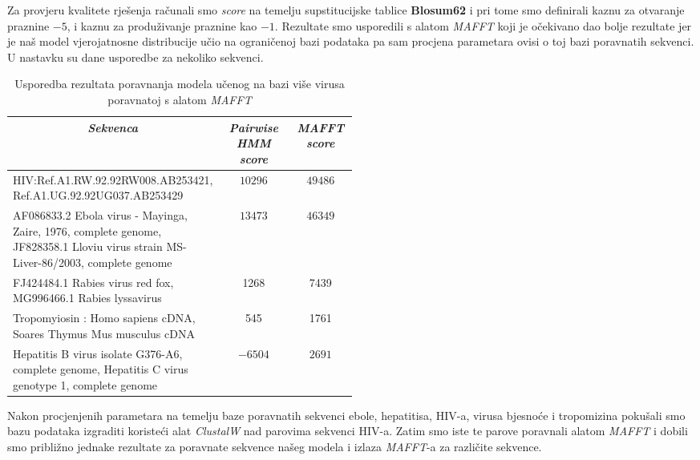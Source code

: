 \documentclass[a4paper]{article}
\begin{document}
Za provjeru kvalitete rješenja računali smo \textit{score} na temelju supstitucijske tablice \textbf{Blosum62} i pri tome smo definirali kaznu za otvaranje praznine $-5$, i kaznu za produživanje praznine kao $-1$. Rezultate smo usporedili s alatom \textit{MAFFT} koji je očekivano dao bolje rezultate jer je naš model vjerojatnosne distribucije učio na ograničenoj bazi podataka pa sam procjena parametara ovisi o toj bazi poravnatih sekvenci. U nastavku su dane usporedbe za nekoliko sekvenci.
\begin{table}[H]
\centering
\begin{tabular}{|p{0.5\linewidth}|c| c|}
\hline
\multicolumn{1}{|c|}{\textit{\textbf{Sekvenca}}} & \multicolumn{1}{c|}{\textit{\textbf{Pairwise HMM score }}} & \multicolumn{1}{c|}{\textit{\textbf{MAFFT score}}}                                      \tabularnewline \hline
HIV:Ref.A1.RW.92.92RW008.AB253421, Ref.A1.UG.92.92UG037.AB253429 & $10296$ & $49486$  \\ \hline
AF086833.2 Ebola virus - Mayinga, Zaire, 1976, complete genome, JF828358.1 Lloviu virus strain MS-Liver-86/2003, complete genome & $13473$ & $46349$ \\ \hline
FJ424484.1 Rabies virus red fox, MG996466.1 Rabies lyssavirus  & 1268 & 7439 \\ \hline
Tropomyiosin : Homo sapiens cDNA, Soares Thymus Mus musculus cDNA & 545 & 1761 \\ \hline
Hepatitis B virus isolate G376-A6, complete genome, Hepatitis C virus genotype 1, complete genome & $-6504$  & $2691$\\ \hline
\end{tabular}
\caption{Usporedba rezultata poravnanja modela učenog na bazi više virusa poravnatoj s alatom \textit{MAFFT}}
\label{table:virusi}   
\end{table}
Nakon procjenjenih parametara na temelju baze poravnatih sekvenci ebole, hepatitisa, HIV-a, virusa bjesnoće i  tropomizina pokušali smo bazu podataka izgraditi koristeći alat \textit{ClustalW} nad parovima sekvenci HIV-a. Zatim smo iste te parove poravnali alatom \textit{MAFFT} i dobili smo približno jednake rezultate za poravnate sekvence  našeg modela i izlaza \textit{MAFFT}-a za različite sekvence.\\
\end{document}
